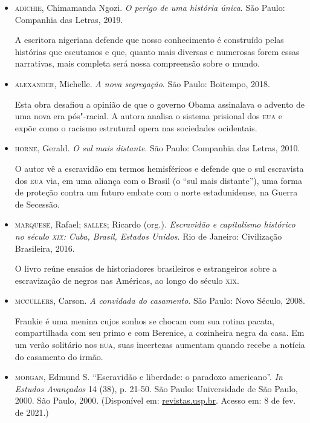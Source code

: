 \documentclass[11pt]{extarticle}
\begin{document}
\begin{itemize}
\item\textsc{adichie}, Chimamanda Ngozi. \textit{O perigo de uma história única}.
  São Paulo: Companhia das Letras, 2019.

A escritora nigeriana defende que nosso conhecimento é construído pelas
histórias que escutamos e que, quanto mais diversas e numerosas forem
essas narrativas, mais completa será nossa compreensão sobre o mundo.

\item\textsc{alexander}, Michelle. \textit{A nova segregação}. São Paulo: Boitempo,
  2018.

Esta obra desafiou a opinião de que o governo Obama assinalava o advento
de uma nova era pós"-racial. A autora analisa o sistema prisional dos \textsc{eua}
e expõe como o racismo estrutural opera nas sociedades ocidentais.

\item\textsc{horne}, Gerald. \textit{O sul mais distante}. São Paulo: Companhia das
  Letras, 2010.

O autor vê a escravidão em termos hemisféricos e defende que o sul
escravista dos \textsc{eua} via, em uma aliança com o Brasil (o ``sul mais
distante''), uma forma de proteção contra um futuro embate com o norte
estadunidense, na Guerra de Secessão.

\item\textsc{marquese}, Rafael; \textsc{salles}; Ricardo (org.). \textit{Escravidão e
  capitalismo histórico no século \textsc{xix}: Cuba, Brasil, Estados Unidos}.
  Rio de Janeiro: Civilização Brasileira, 2016.

O livro reúne ensaios de historiadores brasileiros e estrangeiros sobre
a escravização de negros nas Américas, ao longo do século \textsc{xix}.

\item\textsc{mccullers}, Carson. \textit{A convidada do casamento}. São Paulo: Novo
  Século, 2008.

Frankie é uma menina cujos sonhos se chocam com sua rotina pacata,
compartilhada com seu primo e com Berenice, a cozinheira negra da casa.
Em um verão solitário nos \textsc{eua}, suas incertezas aumentam quando recebe a
notícia do casamento do irmão.

\item\textsc{morgan}, Edmund S. ``Escravidão e liberdade: o paradoxo americano''.
  \emph{In} \textit{Estudos Avançados} 14 (38), p. 21-50. São Paulo:
  Universidade de São Paulo, 2000. São Paulo, 2000. (Disponível em:
  \href{http://www.revistas.usp.br/eav/article/view/9507}{revistas.usp.br}.
  Acesso em: 8 de fev. de 2021.)


\end{itemize}
\end{document}
